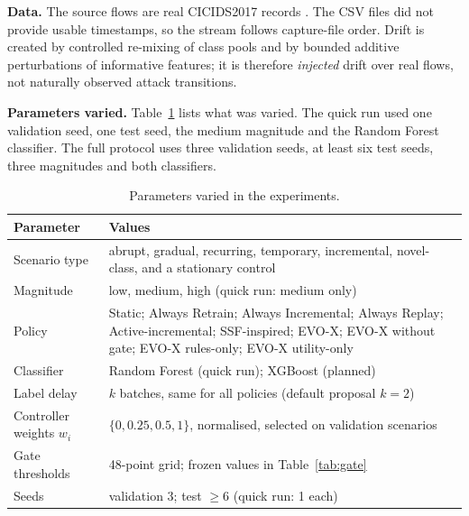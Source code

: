 \documentclass{article}
\begin{document}
\textbf{Data.} The source flows are real CICIDS2017 records \cite{sharafaldin2018cicids}. The CSV files did not provide usable timestamps, so the stream follows capture-file order. Drift is created by controlled re-mixing of class pools and by bounded additive perturbations of informative features; it is therefore \emph{injected} drift over real flows, not naturally observed attack transitions.

\textbf{Parameters varied.} Table~\ref{tab:params} lists what was varied. The quick run used one validation seed, one test seed, the medium magnitude and the Random Forest classifier. The full protocol uses three validation seeds, at least six test seeds, three magnitudes and both classifiers.

\begin{table}[h]
\centering
\caption{Parameters varied in the experiments.}
\label{tab:params}
\small
\begin{tabular}{p{3.8cm}p{9cm}}
\toprule
Parameter & Values \\
\midrule
Scenario type & abrupt, gradual, recurring, temporary, incremental, novel-class, and a stationary control \\
Magnitude & low, medium, high (quick run: medium only) \\
Policy & Static; Always Retrain; Always Incremental; Always Replay; Active-incremental; SSF-inspired; EVO-X; EVO-X without gate; EVO-X rules-only; EVO-X utility-only \\
Classifier & Random Forest (quick run); XGBoost (planned) \\
Label delay & $k$ batches, same for all policies (default proposal $k=2$) \\
Controller weights $w_i$ & $\{0,0.25,0.5,1\}$, normalised, selected on validation scenarios \\
Gate thresholds & 48-point grid; frozen values in Table~\ref{tab:gate} \\
Seeds & validation 3; test $\ge 6$ (quick run: 1 each) \\
\bottomrule
\end{tabular}
\end{table}
\end{document}
